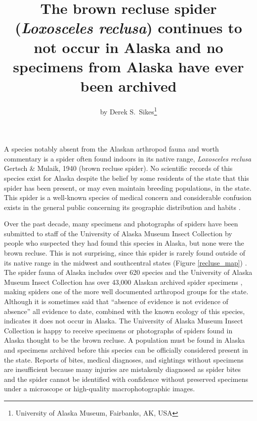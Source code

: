 \title{The brown recluse spider (\textit{Loxosceles reclusa}) continues to not occur in Alaska and no specimens from Alaska have ever been archived}

\subtitle{}

\author{by Derek S.\ Sikes\footnote{University of Alaska Museum, Fairbanks, AK, USA}}

\maketitle

A species notably absent from the Alaskan arthropod fauna and worth commentary is a spider often found indoors in its native range, \textit{Loxosceles reclusa} Gertsch \& Mulaik, 1940  (brown recluse spider). No scientific records of this species exist for Alaska \citep{Simpsonetal2019} despite the belief by some residents of the state that this spider has been present, or may even maintain breeding populations, in the state. This spider is a well-known species of medical concern and considerable confusion exists in the general public concerning its geographic distribution and habits \citep{VetterBush2002}. 

Over the past decade, many specimens and photographs of spiders have been submitted to staff of the University of Alaska Museum Insect Collection by people who suspected they had found this species in Alaska, but none were the brown recluse. This is not surprising, since this spider is rarely found outside of its native range in the midwest and southcentral  states (Figure \ref{recluse_map}) \citep{VetterBush2002, GBIF2020, iNaturalist2020}. The spider fauna of Alaska includes over 620 species and the University of Alaska Museum Insect Collection has over 43,000 Alaskan archived spider specimens \citep{Sikesetal2017}, making spiders one of the more well documented arthropod groups for the state. Although it is sometimes said that ``absence of evidence is not evidence of absence'' all evidence to date, combined with the known ecology of this species, indicates it does not occur in Alaska. The University of Alaska Museum Insect Collection is happy to receive specimens or photographs of spiders found in Alaska thought to be the brown recluse. A population must be found in Alaska and specimens archived before this species can be officially considered present in the state. Reports of bites, medical diagnoses, and sightings without specimens are insufficient because many injuries are mistakenly diagnosed as spider bites \citep{VetterBush2002} and the spider cannot be identified with confidence without preserved specimens under a microscope or high-quality macrophotographic images.

